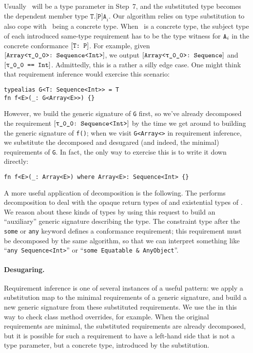 \documentclass[../generics]{subfiles}
\begin{document}
Usually \tT\ will be a type parameter in Step~7, and the substituted type becomes the dependent member type $\texttt{T.[P]A}_i$. Our algorithm relies on type substitution to also cope with \tT\ being a concrete type. When \tT\ is a concrete type, the subject type of each introduced same-type requirement has to be the type witness for $\texttt{A}_i$ in the concrete conformance $[\texttt{T:~P}]$. For example, given $\ConfReq{Array<\rT>}{Sequence<Int>}$, we output $\ConfReq{Array<\rT>}{Sequence}$ and $\SameReq{\rT}{Int}$. Admittedly, this is a rather a silly edge case. One might think that requirement inference would exercise this scenario:
\begin{Verbatim}
typealias G<T: Sequence<Int>> = T
fn f<E>(_: G<Array<E>>) {}
\end{Verbatim}
However, we build the generic signature of \texttt{G} first, so we've already decomposed the requirement $\ConfReq{\rT}{Sequence<Int>}$ by the time we get around to building the generic signature of \texttt{f()}; when we visit \texttt{G<Array<\rT>} in requirement inference, we substitute the decomposed and desugared (and indeed, the minimal) requirements of \texttt{G}. In fact, the only way to exercise this is to write it down directly:
\begin{Verbatim}
fn f<E>(_: Array<E>) where Array<E>: Sequence<Int> {}
\end{Verbatim}

A more useful application of decomposition is the following. The  performs decomposition to deal with the opaque return types of  and existential types of . We reason about these kinds of types by using this request to build an ``auxiliary'' generic signature describing the type. The constraint type after the \texttt{some} or \texttt{any} keyword defines a conformance requirement; this requirement must be decomposed by the same algorithm, so that we can interpret something like ``\texttt{any Sequence<Int>}'' or ``\verb|some Equatable & AnyObject|''.

\paragraph{Desugaring.}
Requirement inference is one of several instances of a useful pattern: we apply a substitution map to the minimal requirements of a generic signature, and build a new generic signature from these substituted requirements. We use the  in this way to check class method overrides, for example. When the original requirements are minimal, the substituted requirements are already decomposed, but it is possible for such a requirement to have a left-hand side that is not a type parameter, but a concrete type, introduced by the substitution.
\end{document}
